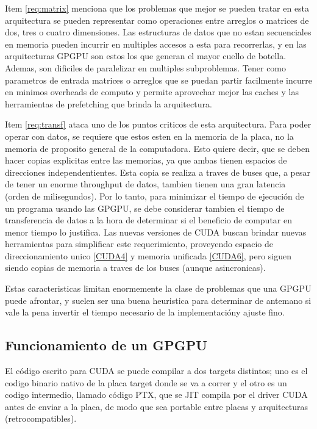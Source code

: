 Item \ref{req:matrix} menciona que los problemas que mejor se pueden tratar en esta
arquitectura se pueden representar como operaciones entre arreglos o matrices de
dos, tres o cuatro dimensiones. Las estructuras de datos que no estan secuenciales
en memoria pueden incurrir en multiples accesos a esta para recorrerlas, y en las
arquitecturas GPGPU son estos los que generan el mayor cuello de botella. Ademas,
son dificiles de paralelizar en multiples subproblemas. Tener como parametros de
entrada matrices o arreglos que se puedan partir facilmente incurre en minimos
overheads de computo y permite aprovechar mejor las caches y las herramientas de
prefetching que brinda la arquitectura.

Item \ref{req:transf} ataca uno de los puntos criticos de esta arquitectura. Para poder
operar con datos, se requiere que estos esten en la memoria de la placa, no la memoria
de proposito general de la computadora. Esto quiere decir, que se deben hacer copias
explicitas entre las memorias, ya que ambas tienen espacios de direcciones independentientes.
Esta copia se realiza a traves de buses que, a pesar de tener un enorme throughput de
datos, tambien tienen una gran latencia (orden de milisegundos). Por lo tanto, para minimizar
el tiempo de ejecuci\'on de un programa usando las GPGPU, se debe considerar tambien el
tiempo de transferencia de datos a la hora de determinar si el beneficio de computar en
menor tiempo lo justifica. Las nuevas versiones de CUDA buscan brindar nuevas herramientas
para simplificar este requerimiento, proveyendo espacio de direccionamiento unico \ref{CUDA4} y
memoria unificada \ref{CUDA6}, pero siguen siendo copias de memoria a traves de los
buses (aunque asincronicas).

Estas caracteristicas limitan enormemente la clase de problemas que una GPGPU puede
afrontar, y suelen ser una buena heuristica para determinar de antemano si vale la pena
invertir el tiempo necesario de la implementaci\'ony ajuste fino.

\subsection{Funcionamiento de un GPGPU}

El c\'odigo escrito para CUDA se puede compilar a dos targets distintos; uno es
el codigo binario nativo de la placa target donde se va a correr y el otro es un
codigo intermedio, llamado c\'odigo PTX, que se JIT compila por el driver CUDA
antes de enviar a la placa, de modo que sea portable entre placas y arquitecturas
(retrocompatibles).

